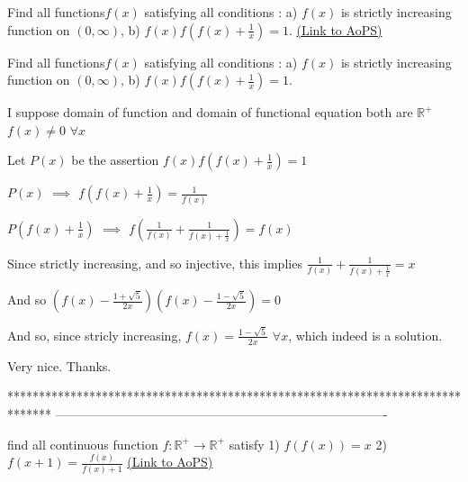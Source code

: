 \begin{problem}
	Find all functions$ f(x)$ satisfying all conditions :
a) $f(x)$ is strictly increasing function on  $(0,\infty)$,
b) $f(x) f( f(x) + \frac{1}{x})=1$.
	\flushright \href{https://artofproblemsolving.com/community/c6h566771}{(Link to AoPS)}
\end{problem}



\begin{solution}
	\begin{tcolorbox}Find all functions$ f(x)$ satisfying all conditions :
a) $f(x)$ is strictly increasing function on  $(0,\infty)$,
b) $f(x) f( f(x) + \frac{1}{x})=1$.\end{tcolorbox}
I suppose domain of function and domain of functional equation both are $\mathbb R^+$
$f(x)\ne 0$ $\forall x$

Let $P(x)$ be the assertion $f(x)f(f(x)+\frac 1x)=1$

$P(x)$ $\implies$ $f(f(x)+\frac 1x)=\frac 1{f(x)}$


$P(f(x)+\frac 1x)$ $\implies$ $f(\frac 1{f(x)}+\frac 1{f(x)+\frac 1x})=f(x)$

Since strictly increasing, and so injective, this implies $\frac 1{f(x)}+\frac 1{f(x)+\frac 1x}=x$

And so $(f(x)-\frac{1+\sqrt 5}{2x})(f(x)-\frac{1-\sqrt 5}{2x})=0$

And so, since stricly increasing, $\boxed{f(x)=\frac{1-\sqrt 5}{2x}}$ $\forall x$, which indeed is a solution.
\end{solution}



\begin{solution}
	Very nice.
Thanks.
\end{solution}
*******************************************************************************
-------------------------------------------------------------------------------

\begin{problem}
	find all continuous function $ f:\mathbb{R}^{+}\to\mathbb{R}^{+} $ satisfy
1) $f(f(x))=x$
2)$ \displaystyle f(x+1)=\frac{f(x)}{f(x)+1} $
	\flushright \href{https://artofproblemsolving.com/community/c6h566821}{(Link to AoPS)}
\end{problem}



